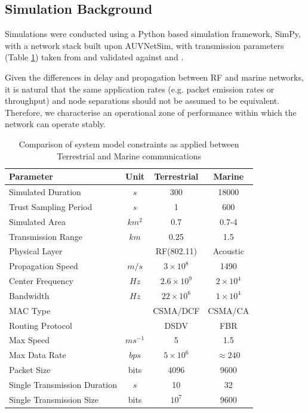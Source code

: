 \documentclass[runningheads,a4paper]{llncs}
\begin{document}
\subsection{Simulation Background}

Simulations were conducted using a Python based simulation framework, SimPy\cite{Mueller2003SimPy}, with a network stack built upon AUVNetSim\cite{Miquel2008}, with transmission parameters (Table \ref{tab:sysconstraints}) taken from and validated against \cite{Stojanovic2007} and \cite{Stefanov2011}.

Given the differences in delay and propagation between RF and marine networks, it is natural that the same application rates (e.g. packet emission rates or throughput) and node separations should not be assumed to be equivalent.
Therefore, we characterise an operational zone of performance within which the network can operate stably.
%
\begin{table}[h]
  \caption{Comparison of system model constraints as applied between Terrestrial and Marine communications} \label{tab:sysconstraints}
  \begin{center}
    \setlength{\tabcolsep}{8pt}
    \begin{tabular}{lccc}
      \toprule
      Parameter & Unit & Terrestrial & Marine \\
      \midrule
      Simulated Duration & $s$ & 300 & 18000\\
      Trust Sampling Period & $s$ & 1 & 600 \\
      Simulated Area & $km^2$ & 0.7 & 0.7-4 \\
      Transmission Range & $km$ & 0.25 & 1.5 \\
      Physical Layer & & RF(802.11) & Acoustic\\
      Propagation Speed& $m/s$ & $3\times10^8$ & 1490\\
      Center Frequency& $Hz$ & $2.6\times10^9$ & $2 \times 10^4$ \\
      Bandwidth& $Hz$ & $22\times10^6$ & $1\times10^4$\\
      MAC Type & & CSMA/DCF & CSMA/CA\\
      Routing Protocol & & DSDV & FBR \\
      Max Speed & $ms^{-1}$ & 5 & 1.5 \\
      Max Data Rate & $bps$ & $5\times10^6$ & $\approx 240$ \\
      Packet Size & bits & 4096 &  9600 \\
      Single Transmission Duration & $s$ & 10 & 32 \\
      Single Transmission Size & bits & $10^7$ & $9600$ \\
      \bottomrule
    \end{tabular}
    \setlength{\tabcolsep}{6pt}
  \end{center}
\end{table}
%
\end{document}
